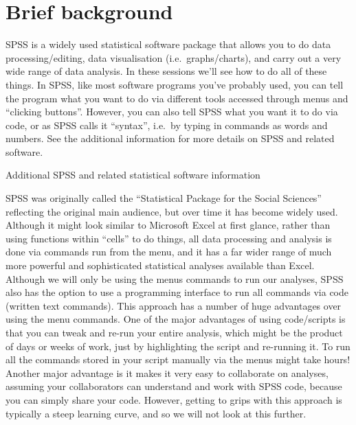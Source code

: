 \documentclass[
]{book}
\begin{document}
\hypertarget{brief-background}{%
\section{Brief background}\label{brief-background}}

SPSS is a widely used statistical software package that allows you to do data processing/editing, data visualisation (i.e.~graphs/charts), and carry out a very wide range of data analysis. In these sessions we'll see how to do all of these things. In SPSS, like most software programs you've probably used, you can tell the program what you want to do via different tools accessed through menus and ``clicking buttons''. However, you can also tell SPSS what you want it to do via code, or as SPSS calls it ``syntax'', i.e.~by typing in commands as words and numbers. See the additional information for more details on SPSS and related software.

Additional SPSS and related statistical software information

SPSS was originally called the ``Statistical Package for the Social Sciences'' reflecting the original main audience, but over time it has become widely used. Although it might look similar to Microsoft Excel at first glance, rather than using functions within ``cells'' to do things, all data processing and analysis is done via commands run from the menu, and it has a far wider range of much more powerful and sophisticated statistical analyses available than Excel. Although we will only be using the menus commands to run our analyses, SPSS also has the option to use a programming interface to run all commands via code (written text commands). This approach has a number of huge advantages over using the menu commands. One of the major advantages of using code/scripts is that you can tweak and re-run your entire analysis, which might be the product of days or weeks of work, just by highlighting the script and re-running it. To run all the commands stored in your script manually via the menus might take hours! Another major advantage is it makes it very easy to collaborate on analyses, assuming your collaborators can understand and work with SPSS code, because you can simply share your code. However, getting to grips with this approach is typically a steep learning curve, and so we will not look at this further.
\end{document}
